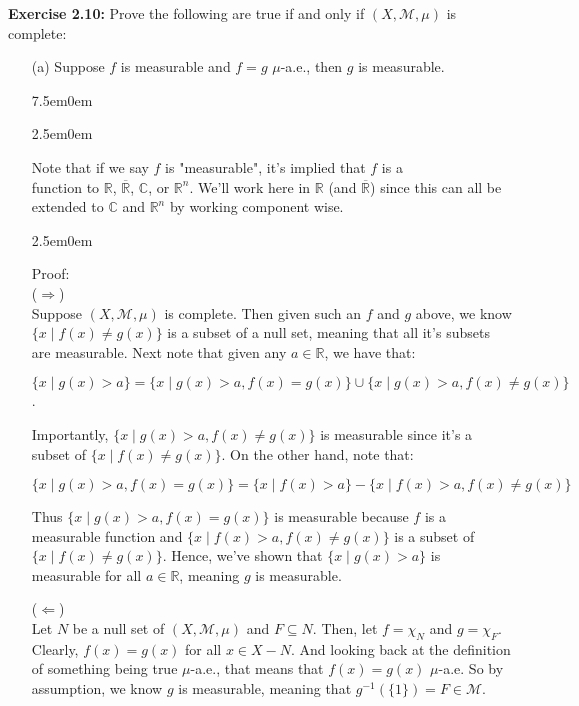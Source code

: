 \documentclass{book}
\newcommand{\myComment}{%
   \color{RawerSienna}%
   \fontsize{12}{14}\selectfont%
}
\newcommand{\exOne}{%
   \color{Purple}%
   \fontsize{13}{15}\selectfont%
}
\newcommand{\exTwoP}{%
   \color{RedViolet}%
   \fontsize{13}{15}\selectfont%
}
\newcommand{\exPP}{%
   \color{RedViolet}%
   \fontsize{12}{14}\selectfont%
}
\newenvironment{myIndent}{%
   \begin{adjustwidth}{2.5em}{0em}%
}{%
   \end{adjustwidth}%
}
\newenvironment{myTindent}{%
   \begin{adjustwidth}{7.5em}{0em}%
}{%
   \end{adjustwidth}%
}
\newcommand{\blab}[1]{\textbf{#1}}
\newcommand{\retTwo}{\hfill\bigbreak}
\begin{document}
\exOne\blab{Exercise 2.10:} Prove the following are true if and only if $(X, \mathcal{M}, \mu)$ is complete:
\begin{enumerate}
   \item[(a)] Suppose $f$ is measurable and $f = g$ $\mu$-a.e., then $g$ is measurable.
   
   \begin{myTindent}\begin{myIndent}\myComment
      Note that if we say $f$ is "measurable", it's implied that $f$ is a\\ function to $\mathbb{R}$, $\overline{\mathbb{R}}$, $\mathbb{C}$, or $\mathbb{R}^n$. We'll work here in $\mathbb{R}$ (and $\overline{\mathbb{R}}$) since this can all be extended to $\mathbb{C}$ and $\mathbb{R}^n$ by working component wise.
   \end{myIndent}\end{myTindent}
   
   \begin{myIndent}\exTwoP
      Proof:\\
      ($\Longrightarrow$)\\
      Suppose $(X, \mathcal{M}, \mu)$ is complete. Then given such an $f$ and $g$ above, we know $\{x \mid f(x) \neq g(x)\}$ is a subset of a null set, meaning that all it's subsets are measurable. Next note that given any $a \in \mathbb{R}$, we have that:

      {\centering\exPP $\{x \mid g(x) > a\} = \{x \mid g(x) > a, f(x) = g(x)\} \cup \{x \mid g(x) > a, f(x) \neq g(x)\}$. \retTwo\par}

      Importantly, $\{x \mid g(x) > a, f(x) \neq g(x)\}$ is measurable since it's a subset of $\{x \mid f(x) \neq g(x)\}$. On the other hand, note that:
      
      {\centering\exPP $\{x \mid g(x) > a, f(x) = g(x)\} = \{x \mid f(x) > a\} - \{x \mid f(x) > a, f(x) \neq g(x)\}$ \retTwo\par}
      
      Thus $\{x \mid g(x) > a, f(x) = g(x)\}$ is measurable because $f$ is a measurable function and $\{x \mid f(x) > a, f(x) \neq g(x)\}$ is a subset of $\{x \mid f(x) \neq g(x)\}$. Hence, we've shown that $\{x \mid g(x) > a\}$ is measurable for all $a \in \mathbb{R}$, meaning $g$ is measurable.\retTwo

      ($\Longleftarrow$)\\
      Let $N$ be a null set of $(X, \mathcal{M}, \mu)$ and $F \subseteq N$. Then, let $f = \chi_{N}$ and $g = \chi_F$. Clearly, $f(x) = g(x)$ for all $x \in X - N$. And looking back at the definition of something being true $\mu$-a.e., that means that $f(x) = g(x)$ $\mu$-a.e. So by assumption, we know $g$ is measurable, meaning that $g^{-1}(\{1\}) = F \in \mathcal{M}$. 
   \end{myIndent}


\end{enumerate}
\end{document}
